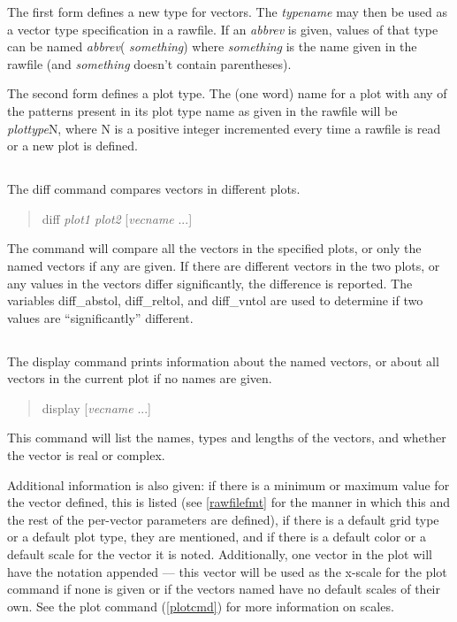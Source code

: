 The first form defines a new type for vectors.  The {\it typename} may
then be used as a vector type specification in a rawfile.  If an {\it
abbrev} is given, values of that type can be named {\it abbrev}({\it
something}) where {\it something} is the name given in the rawfile
(and {\it something} doesn't contain parentheses).

The second form defines a plot type.  The (one word) name for a plot
with any of the patterns present in its plot type name as given in the
rawfile will be {\it plottype}N, where N is a positive integer
incremented every time a rawfile is read or a new plot is defined.

\subsection{}


The {\cb diff} command compares vectors in different plots.
\begin{quote}\vt
diff {\it plot1 plot2} [{\it vecname} ...]
\end{quote}
The command will compare all the vectors in the specified
plots, or only the named vectors if any are given.  If there are
different vectors in the two plots, or any values in the vectors
differ significantly, the difference is reported.  The variables {\et
diff\_abstol}, {\et diff\_reltol}, and {\et diff\_vntol} are used to
determine if two values are ``significantly'' different.

\subsection{}


The {\cb display} command prints information about the named vectors,
or about all vectors in the current plot if no names are given.
\begin{quote}\vt
display [{\it vecname} ...]
\end{quote}
This command will list the names, types and lengths of the vectors,
and whether the vector is real or complex.

Additional information is also given:  if there is a minimum or
maximum value for the vector defined, this is listed (see
\ref{rawfilefmt} for the manner in which this and the rest of the
per-vector parameters are defined), if there is a default grid type or
a default plot type, they are mentioned, and if there is a default
color or a default scale for the vector it is noted.  Additionally,
one vector in the plot will have the notation {}
appended --- this vector will be used as the x-scale for the {\cb
plot} command if none is given or if the vectors named have no default
scales of their own.  See the {\cb plot} command (\ref{plotcmd}) for
more information on scales.


